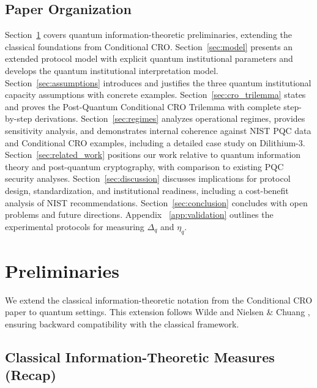 \documentclass{ieeeaccess}
\begin{document}
\subsection{Paper Organization}

Section~\ref{sec:preliminaries} covers quantum information-theoretic preliminaries, extending the classical foundations from Conditional CRO. Section~\ref{sec:model} presents an extended protocol model with explicit quantum institutional parameters and develops the quantum institutional interpretation model. Section~\ref{sec:assumptions} introduces and justifies the three quantum institutional capacity assumptions with concrete examples. Section~\ref{sec:cro_trilemma} states and proves the Post-Quantum Conditional CRO Trilemma with complete step-by-step derivations. Section~\ref{sec:regimes} analyzes operational regimes, provides sensitivity analysis, and demonstrates internal coherence against NIST PQC data and Conditional CRO examples, including a detailed case study on Dilithium-3. Section~\ref{sec:related_work} positions our work relative to quantum information theory and post-quantum cryptography, with comparison to existing PQC security analyses. Section~\ref{sec:discussion} discusses implications for protocol design, standardization, and institutional readiness, including a cost-benefit analysis of NIST recommendations. Section~\ref{sec:conclusion} concludes with open problems and future directions.  Appendix ~\ref{app:validation} outlines the experimental protocols for measuring $\Delta_q$ and $\eta_q$.


\section{Preliminaries}\label{sec:preliminaries}

We extend the classical information-theoretic notation from the Conditional CRO paper \cite{Minka2026CRO} to quantum settings. This extension follows Wilde \cite{Wilde2017} and Nielsen \& Chuang \cite{NielsenChuang2010}, ensuring backward compatibility with the classical framework.

\subsection{Classical Information-Theoretic Measures (Recap)}
\end{document}
